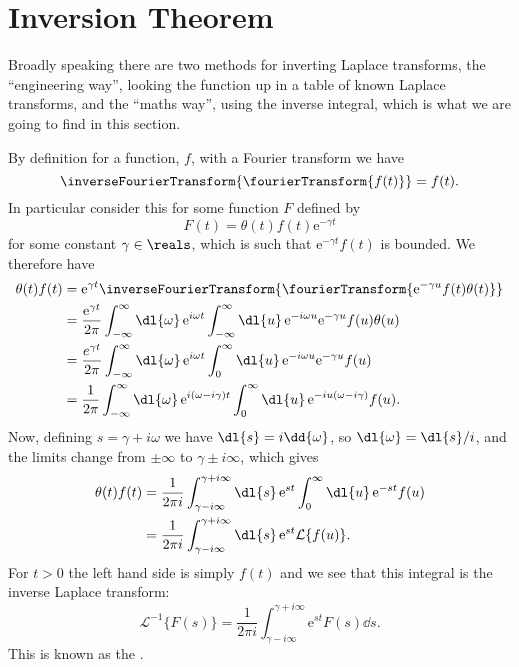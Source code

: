 \documentclass[fleqn]{NotesClass}
\newcommand*{\e}{\mathrm{e}}
\newcommand*{\laplaceTransform}{\mathcal{L}}
\newcommand*{\inverseLaplaceTransform}{\laplaceTransform^{-1}}
\begin{document}
    \section{Inversion Theorem}
    Broadly speaking there are two methods for inverting Laplace transforms, the \enquote{engineering way}, looking the function up in a table of known Laplace transforms, and the \enquote{maths way}, using the inverse integral, which is what we are going to find in this section.
    
    By definition for a function, \(f\), with a Fourier transform we have
    \begin{equation}
        \inverseFourierTransform\{ \fourierTransform\{ f(t) \} \} = f(t).
    \end{equation}
    In particular consider this for some function \(F\) defined by
    \begin{equation}
        F(t) = \theta(t) f(t) \e^{-\gamma t}
    \end{equation}
    for some constant \(\gamma \in \reals\), which is such that \(\e^{-\gamma t}f(t)\) is bounded.
    We therefore have
    \begin{align}
        \theta(t)f(t) &= \e^{\gamma t}\inverseFourierTransform\{ \fourierTransform\{ \e^{-\gamma u}f(t)\theta(t) \} \}\\
        &= \frac{\e^{\gamma t}}{2\pi} \int_{-\infty}^{\infty} \dl{\omega} \, \e^{i\omega t} \int_{-\infty}^{\infty} \dl{u} \, \e^{-i\omega u} \e^{-\gamma u} f(u) \theta(u)\\
        &= \frac{e^{\gamma t}}{2\pi} \int_{-\infty}^{\infty} \dl{\omega} \, \e^{i\omega t} \int_{0}^{\infty} \dl{u} \, \e^{-i\omega u}\e^{-\gamma u} f(u)\\
        &= \frac{1}{2\pi} \int_{-\infty}^{\infty} \dl{\omega} \, \e^{i(\omega - i\gamma)t} \int_{0}^{\infty} \dl{u} \, \e^{-iu(\omega - i\gamma)} f(u).
    \end{align}
    Now, defining \(s = \gamma + i\omega\) we have \(\dl{s} = i\dd{\omega}\), so \(\dl{\omega} = \dl{s}/i\), and the limits change from \(\pm \infty\) to \(\gamma \pm i\infty\), which gives
    \begin{align}
        \theta(t)f(t) &= \frac{1}{2\pi i} \int_{\gamma - i\infty}^{\gamma + i\infty} \dl{s} \, \e^{st} \int_{0}^{\infty} \dl{u} \, \e^{-st}f(u)\\
        &= \frac{1}{2\pi i} \int_{\gamma - i\infty}^{\gamma + i\infty} \dl{s} \, \e^{st} \laplaceTransform\{ f(u) \}.
    \end{align}
    For \(t > 0\) the left hand side is simply \(f(t)\) and we see that this integral is the inverse Laplace transform:
    \begin{equation}
        \inverseLaplaceTransform\{ F(s) \} = \frac{1}{2\pi i}\int_{\gamma - i\infty}^{\gamma + i\infty} \e^{st} F(s) \dd{s}.
    \end{equation}
    This is known as the .
    
\end{document}
